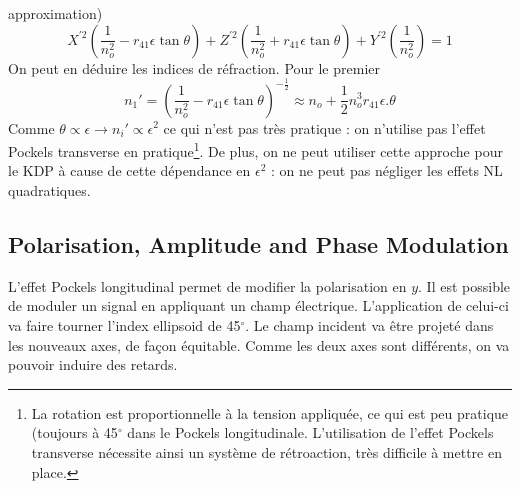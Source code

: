 approximation)
\begin{equation}
X^{'2}\left(\dfrac{1}{n_o^2}-r_{41}\epsilon\tan\theta\right)+
Z^{'2}\left(\dfrac{1}{n_o^2}+r_{41}\epsilon\tan\theta\right)+
Y^{'2}\left(\dfrac{1}{n_o^2}\right)=1
\end{equation}
On peut en déduire les indices de réfraction. Pour le premier
\begin{equation}
n_1' =\left(\dfrac{1}{n_o^2}-r_{41}\epsilon\tan\theta\right)^{-\frac{1}{2}}\approx
n_o+\frac{1}{2}n_o^3r_{41}\epsilon.\theta
\end{equation}
Comme $\theta\propto \epsilon\to n_i' \propto \epsilon^2$ ce qui n'est pas très pratique : on n'utilise
pas l'effet Pockels transverse en pratique\footnote{La rotation est proportionnelle à la tension appliquée, ce qui est peu pratique (toujours à 45$^\circ$ dans le Pockels longitudinale. L'utilisation de l'effet Pockels transverse nécessite ainsi un système de rétroaction, très difficile à mettre en place.}. De plus, on ne peut utiliser cette approche pour le KDP à 
cause de cette dépendance en $\epsilon^2$ : on ne peut pas négliger les effets NL quadratiques.


\subsection{Polarisation, Amplitude and Phase Modulation}
L'effet Pockels longitudinal permet de modifier la polarisation en $y$. Il est possible de moduler un
signal en appliquant un champ électrique. L'application de celui-ci va faire tourner l'index ellipsoid
de 45$^\circ$. Le champ incident va être projeté dans les nouveaux axes, de façon équitable. Comme
les deux axes sont différents, on va pouvoir induire des retards. 

